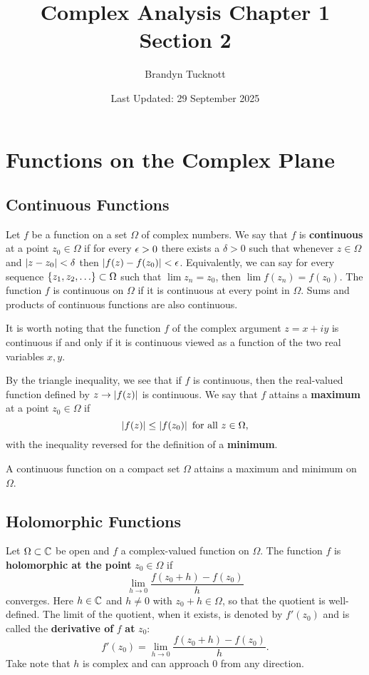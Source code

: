 \documentclass{exam}
\title{Complex Analysis Chapter 1 Section 2}
\author{Brandyn Tucknott}
\date{Last Updated: 29 September 2025}
\begin{document}
\maketitle

\section{Functions on the Complex Plane}
\subsection{Continuous Functions}
Let $f$ be a function on a set $\Omega$ of complex numbers. We say that $f$ is \textbf{continuous}
at a point $z_0\in\Omega$ if for every $\epsilon > 0$ there exists a $\delta > 0$ such that whenever
$z\in\Omega$ and $\left| z - z_0 \right| < \delta$ then $\left| f(z) - f(z_0) \right| < \epsilon$. Equivalently, we can 
say for every sequence $\left \{ z_1, z_2, \hdots \right \}\subset \Omega$ such that $\lim z_n = z_0$, then
$\lim f(z_n) = f(z_0)$. The function $f$ is continuous on $\Omega$ if it is continuous at every
point in $\Omega$. Sums and products of continuous functions are also continuous.

It is worth noting that the function $f$ of the complex argument $z = x + iy$ is continuous if and
only if it is continuous viewed as a function of the two real variables $x, y$.

By the triangle inequality, we see that if $f$ is continuous, then the real-valued function defined
by $z\to\left| f(z) \right|$ is continuous. We say that $f$ attains a \textbf{maximum} at a point $z_0\in\Omega$
if
$$\left| f(z) \right| \leq \left| f(z_0) \right|\text{ for all }z\in\Omega,$$
with the inequality reversed for the definition of a \textbf{minimum}.

\begin{theorem}\label{thm:main}
    A continuous function on a compact set $\Omega$ attains a maximum and minimum on $\Omega$.
\end{theorem}


\subsection{Holomorphic Functions}
Let $\Omega\subset\mathbb{C}$ be open and $f$ a complex-valued function on $\Omega$. The function $f$ is
\textbf{holomorphic at the point} $z_0\in\Omega$ if
$$\lim_{h\to 0}\frac{f(z_0 + h) - f(z_0)}{h}$$
converges. Here $h\in\mathbb{C}$ and $h\neq 0$ with $z_0 + h\in\Omega$, so that the quotient is well-defined.
The limit of the quotient, when it exists, is denoted by $f'(z_0)$ and is called the \textbf{derivative
of} $f$ \textbf{at} $z_0$:
$$f'(z_0) = \lim_{h\to 0}\frac{f(z_0 + h) - f(z_0)}{h}.$$
Take note that $h$ is complex and can approach $0$ from any direction.
\end{document}
